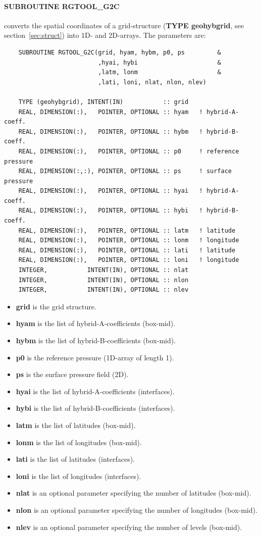 \documentclass[12pt, a4paper]{article}
\begin{document}
\paragraph{\bf SUBROUTINE RGTOOL\_G2C} converts the spatial
coordinates of a grid-structure
({\bf TYPE geohybgrid}, see section~\ref{sec:struct}) into 1D- and 2D-arrays.
The parameters are:
%
\begin{verbatim}
    SUBROUTINE RGTOOL_G2C(grid, hyam, hybm, p0, ps         &
                          ,hyai, hybi                      &
                          ,latm, lonm                      &
                          ,lati, loni, nlat, nlon, nlev)

    TYPE (geohybgrid), INTENT(IN)           :: grid
    REAL, DIMENSION(:),   POINTER, OPTIONAL :: hyam   ! hybrid-A-coeff.
    REAL, DIMENSION(:),   POINTER, OPTIONAL :: hybm   ! hybrid-B-coeff.
    REAL, DIMENSION(:),   POINTER, OPTIONAL :: p0     ! reference pressure
    REAL, DIMENSION(:,:), POINTER, OPTIONAL :: ps     ! surface pressure
    REAL, DIMENSION(:),   POINTER, OPTIONAL :: hyai   ! hybrid-A-coeff.
    REAL, DIMENSION(:),   POINTER, OPTIONAL :: hybi   ! hybrid-B-coeff.
    REAL, DIMENSION(:),   POINTER, OPTIONAL :: latm   ! latitude
    REAL, DIMENSION(:),   POINTER, OPTIONAL :: lonm   ! longitude
    REAL, DIMENSION(:),   POINTER, OPTIONAL :: lati   ! latitude
    REAL, DIMENSION(:),   POINTER, OPTIONAL :: loni   ! longitude
    INTEGER,           INTENT(IN), OPTIONAL :: nlat
    INTEGER,           INTENT(IN), OPTIONAL :: nlon
    INTEGER,           INTENT(IN), OPTIONAL :: nlev
\end{verbatim}
%
\begin{itemize}
\item {\bf grid} is the grid structure.
\item {\bf hyam} is the list of hybrid-A-coefficients (box-mid).
\item {\bf hybm} is the list of hybrid-B-coefficients (box-mid).
\item {\bf p0} is the reference pressure (1D-array of length 1).
\item {\bf ps} is the surface pressure field (2D).
\item {\bf hyai} is the list of hybrid-A-coefficients (interfaces).
\item {\bf hybi} is the list of hybrid-B-coefficients (interfaces).
\item {\bf latm} is the list of latitudes (box-mid).
\item {\bf lonm} is the list of longitudes (box-mid).
\item {\bf lati} is the list of latitudes (interfaces).
\item {\bf loni} is the list of longitudes (interfaces).
\item {\bf nlat} is an optional parameter specifying the number
                     of latitudes (box-mid).
\item {\bf nlon} is an optional parameter specifying the number
                     of longitudes (box-mid).
\item {\bf nlev} is an optional parameter specifying the number
                     of levels (box-mid).
\end{itemize}
\end{document}
